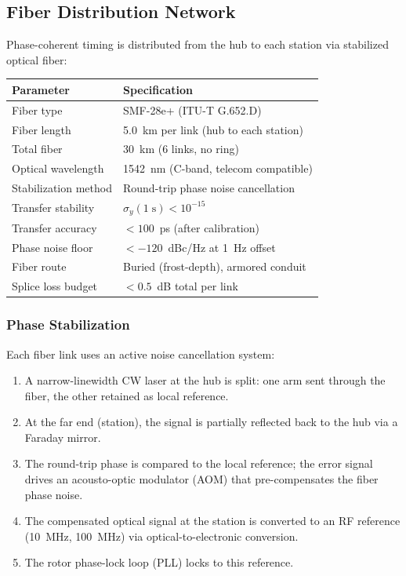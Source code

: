\documentclass[11pt,a4paper]{article}
\begin{document}
\subsection{Fiber Distribution Network}

Phase-coherent timing is distributed from the hub to each station via
stabilized optical fiber:

\begin{longtable}{p{5cm}p{8cm}}
\toprule
\textbf{Parameter} & \textbf{Specification} \\
\midrule
\endfirsthead
Fiber type & SMF-28e+ (ITU-T G.652.D) \\
Fiber length & 5.0~km per link (hub to each station) \\
Total fiber & 30~km (6 links, no ring) \\
Optical wavelength & 1542~nm (C-band, telecom compatible) \\
Stabilization method & Round-trip phase noise cancellation \\
Transfer stability & $\sigma_y(1\;\text{s}) < 10^{-15}$ \\
Transfer accuracy & $< 100$~ps (after calibration) \\
Phase noise floor & $< -120$~dBc/Hz at 1~Hz offset \\
Fiber route & Buried (frost-depth), armored conduit \\
Splice loss budget & $< 0.5$~dB total per link \\
\bottomrule
\end{longtable}

\subsubsection{Phase Stabilization}

Each fiber link uses an active noise cancellation system:
\begin{enumerate}
\item A narrow-linewidth CW laser at the hub is split: one arm sent
  through the fiber, the other retained as local reference.
\item At the far end (station), the signal is partially reflected back
  to the hub via a Faraday mirror.
\item The round-trip phase is compared to the local reference;
  the error signal drives an acousto-optic modulator (AOM) that
  pre-compensates the fiber phase noise.
\item The compensated optical signal at the station is converted to
  an RF reference (10~MHz, 100~MHz) via optical-to-electronic
  conversion.
\item The rotor phase-lock loop (PLL) locks to this reference.
\end{enumerate}
\end{document}
